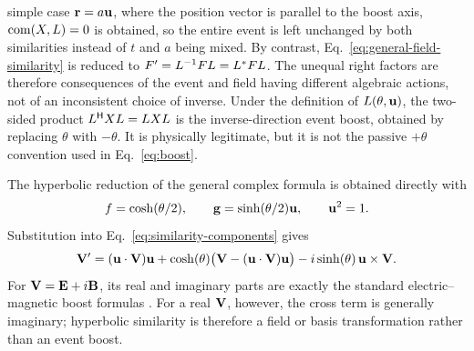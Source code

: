 simple case \(\mathbf{r}=a\mathbf{u}\), where the position vector is parallel to
the boost axis,
\(\operatorname{com}\!\left(X,L\right)=0\) is obtained, so the entire event is left unchanged
by both similarities instead of \(t\) and \(a\) being mixed.
By contrast,
Eq.\ \eqref{eq:general-field-similarity} is reduced to
\(F'=L^{-1}FL
=L^*FL\).
The unequal right factors are therefore consequences of the event and field
having different algebraic actions, not of an inconsistent choice of
inverse. Under the definition of \(L(\theta,\mathbf{u})\), the two-sided
product \(L^{\mathsf H}XL
=LXL\) is the inverse-direction event boost, obtained by
replacing \(\theta\) with \(-\theta\). It is physically legitimate, but it
is not the passive \(+\theta\) convention used in Eq.\ \eqref{eq:boost}.

The hyperbolic reduction of the general complex formula is obtained
directly with
\[
f=\cosh(\theta/2),
\qquad
\mathbf{g}=\sinh(\theta/2)\mathbf{u},
\qquad
\mathbf{u}^2=1.
\]
Substitution into Eq.\ \eqref{eq:similarity-components} gives
\begin{equation}
\mathbf{V}'
=(\mathbf{u}\cdot\mathbf{V})\mathbf{u}
+\cosh(\theta)\bigl(\mathbf{V}-(\mathbf{u}\cdot\mathbf{V})\mathbf{u}\bigr)
-i\sinh(\theta)\,\mathbf{u}\times\mathbf{V}.
\label{eq:hyperbolic-similarity}
\end{equation}
For \(\mathbf{V}=\mathbf{E}+i\mathbf{B}\), its real and imaginary parts are
exactly the standard electric--magnetic boost formulas
\cite{jackson1998}. For a real \(\mathbf{V}\),
however, the cross term is generally imaginary; hyperbolic similarity is
therefore a field or basis transformation rather than an event boost.

